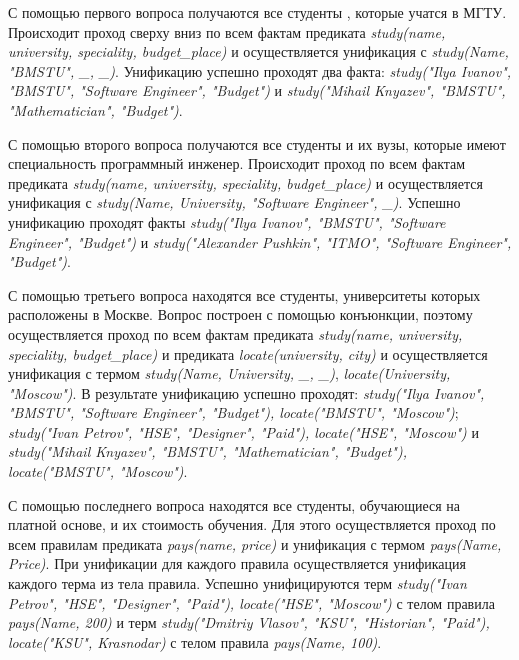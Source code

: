 \documentclass[a4paper,12pt]{article}
\begin{document}
С помощью первого вопроса получаются все студенты , которые учатся в МГТУ. Происходит проход сверху вниз по всем фактам предиката \emph{study(name, university, speciality, budget\_place)} и осуществляется унификация с \emph{study(Name, "BMSTU"{}, \_, \_)}. Унификацию успешно проходят два факта: \emph{study("Ilya Ivanov"{}, "BMSTU"{}, "Software Engineer"{}, "Budget")} и \emph{study("Mihail Knyazev"{}, "BMSTU"{}, "Mathematician"{}, "Budget")}.

С помощью второго вопроса получаются все студенты и их вузы, которые имеют специальность программный инженер.  Происходит проход по всем фактам предиката \emph{study(name, university, speciality, budget\_place)} и осуществляется унификация с \emph{study(Name, University, "Software Engineer"{}, \_)}.  Успешно унификацию проходят факты \emph{study("Ilya Ivanov"{}, "BMSTU"{}, "Software Engineer"{}, "Budget")} и \emph{study("Alexander Pushkin"{}, "ITMO"{}, "Software Engineer"{}, "Budget")}.

С помощью третьего вопроса находятся все студенты, университеты которых расположены в Москве. Вопрос построен с помощью конъюнкции, поэтому осуществляется проход по всем фактам предиката \emph{study(name, university, speciality, budget\_place)} и предиката \emph{locate(university, city)} и осуществляется унификация с термом \emph{study(Name, University, \_, \_)}, \emph{locate(University, "Moscow")}. В результате унификацию успешно проходят: \emph{study("Ilya Ivanov"{}, "BMSTU"{}, "Software Engineer"{}, "Budget"), locate("BMSTU"{}, "Moscow")}; \emph{study("Ivan Petrov"{}, "HSE"{}, "Designer"{}, "Paid"), locate("HSE"{}, "Moscow")} и \emph{study("Mihail Knyazev"{}, "BMSTU"{}, "Mathematician"{}, "Budget"), locate("BMSTU"{}, "Moscow")}. 

С помощью последнего вопроса находятся все студенты, обучающиеся на платной основе, и их стоимость обучения. Для этого осуществляется проход по всем правилам предиката \emph{pays(name, price)} и унификация с термом \emph{pays(Name, Price)}. При унификации для каждого правила осуществляется унификация каждого терма из тела правила. Успешно унифицируются терм \emph{study("Ivan Petrov"{}, "HSE"{}, "Designer"{}, "Paid"), locate("HSE"{}, "Moscow")} с телом правила \emph{pays(Name, 200)} и терм \emph{study("Dmitriy Vlasov"{}, "KSU"{}, "Historian"{}, "Paid"), locate("KSU"{}, Krasnodar)} с телом правила \emph{pays(Name, 100)}.
\end{document}
